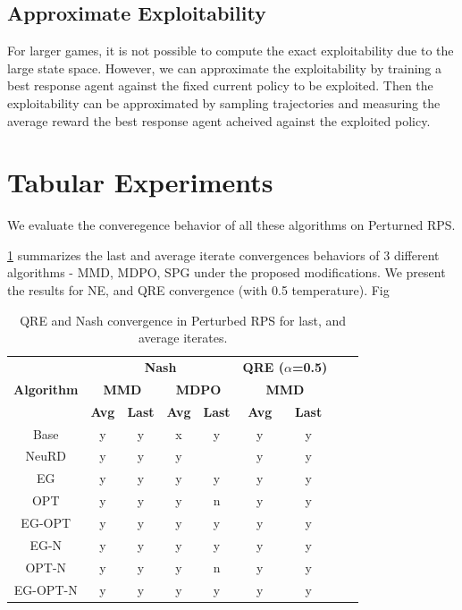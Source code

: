 
\subsection{Approximate Exploitability}
For larger games, it is not possible to compute the exact exploitability due to the large state space. 
However, we can approximate the exploitability by training a best response agent against the fixed current policy to be exploited. 
Then the exploitability can be approximated by sampling trajectories and measuring the average reward the best response 
agent acheived against the exploited policy.

\section{Tabular Experiments}
We evaluate the converegence behavior of all these algorithms on Perturned RPS.


\ref{tab:tabres} summarizes the last and average iterate convergences behaviors of 3 different algorithms -
MMD, MDPO, SPG under the proposed modifications.
We present the results for NE, and QRE convergence (with 0.5 temperature). Fig


\begin{table}[htbp]
	\centering
	\begin{tabular}{|c|c|c|c|c|c|c|c|c|}
	\hline
	\multirow{3}{*}{\textbf{Algorithm}} &
	\multicolumn{4}{c|}{\textbf{Nash}} &
	\multicolumn{2}{c|}{\textbf{QRE ($\alpha$=0.5)}} \\
	\cline{2-7}
	& 
	\multicolumn{2}{c|}{\textbf{MMD}} & 
	\multicolumn{2}{c|}{\textbf{MDPO}} &
	\multicolumn{2}{c|}{\textbf{MMD}} \\
	\cline{2-7}
	& \textbf{Avg} & \textbf{Last} & \textbf{Avg} & \textbf{Last}
	& \textbf{Avg} & \textbf{Last} \\
	\hline
	Base	 	& y & y & x & y 		& y & y \\
	\hline
	NeuRD 		& y & y & y & \red{x} 	& y & y \\
	\hline
	EG 			& y & y & y & y 	& y & y \\
	\hline
	OPT 		& y & y & y & n 	& y & y \\
	\hline
	EG-OPT 		& y & y & y & y 	& y & y \\
	\hline
	EG-N 		& y & y & y & y 	& y & y \\
	\hline
	OPT-N 		& y & y & y & n 	& y & y \\
	\hline
	EG-OPT-N	& y & y & y & y 	& y & y \\
	\hline
	\end{tabular}
	\caption{QRE and Nash convergence in Perturbed RPS for last, and average iterates.}
	\label{tab:tabres}
\end{table}

